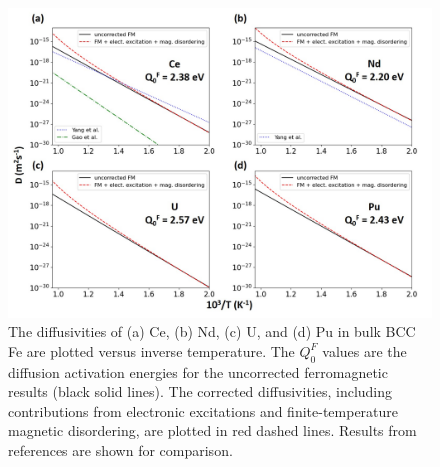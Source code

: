\documentclass[preprint,12pt]{elsarticle}
\begin{document}

\begin{figure}[!ht]
    \centering
    \includegraphics[width=\linewidth]{diffusivities_Q.jpg}
    \caption{The diffusivities of (a) Ce, (b) Nd, (c) U, and (d) Pu in bulk BCC Fe are plotted versus inverse temperature. The $Q_0^F$ values are the diffusion activation energies for the uncorrected ferromagnetic results (black solid lines). The corrected diffusivities, including contributions from electronic excitations and finite-temperature magnetic disordering, are plotted in red dashed lines. Results from references \cite{yang_significant_2023, GAO2016316} are shown for comparison.}
    \label{fig:diff_Q}
\end{figure}
\end{document}
